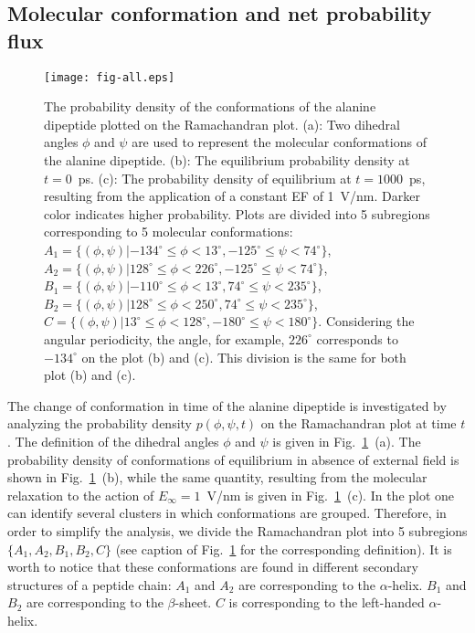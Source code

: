 \documentclass[a4paper,preprint,unsortedaddress,onecolumn]{revtex4-1}
\begin{document}
\subsection{Molecular conformation and net probability flux}

\begin{figure}
  \centering
  \texttt{[image: fig-all.eps]}
  \caption{
    The probability density of the conformations of the alanine dipeptide plotted on the Ramachandran plot.
    (a): Two dihedral angles
    $\phi$ and $\psi$ are used to represent the molecular conformations of the alanine dipeptide.
    (b): The equilibrium probability density 
    at $t=0$~\textsf{ps}. (c): The probability density of equilibrium at $t=1000$~\textsf{ps}, resulting from the application of a constant EF of 1~V/nm. Darker color
    indicates higher probability.
    Plots are divided into 5 subregions corresponding
    to 5 molecular conformations:
    $A_1 = \{(\phi, \psi) | -134^\circ \leq \phi <  13^\circ, -125^\circ \leq \psi < 74^\circ\}$,
    $A_2 = \{(\phi, \psi) |  128^\circ \leq \phi < 226^\circ, -125^\circ \leq \psi < 74^\circ\}$,
    $B_1 = \{(\phi, \psi) | -110^\circ \leq \phi <  13^\circ,   74^\circ \leq \psi < 235^\circ\}$,
    $B_2 = \{(\phi, \psi) |  128^\circ \leq \phi < 250^\circ,   74^\circ \leq \psi < 235^\circ\}$,
    $C   = \{(\phi, \psi) |   13^\circ \leq \phi < 128^\circ, -180^\circ \leq \psi < 180^\circ\}$.
    Considering the angular periodicity, the angle, for example, $226^\circ$ corresponds to $-134^\circ$
    on the plot (b) and (c).
    This division is the same for both plot (b) and (c).
  }
  \label{fig:tmp4}
\end{figure}

The change of conformation in time of the alanine dipeptide is
investigated by analyzing the probability density $p(\phi,\psi,t)$ on
the Ramachandran plot at time $t$. The definition of the dihedral
angles $\phi$ and $\psi$ is given in Fig.~\ref{fig:tmp4}~(a).
The probability density of conformations of equilibrium in absence of external field is shown in Fig.~\ref{fig:tmp4}~(b), while the same quantity, resulting from the molecular relaxation to the action of $E_{\infty} = 1$~V/nm is
given in Fig.~\ref{fig:tmp4}~(c). In the plot one can identify several clusters
in which conformations are grouped.
Therefore, in order to simplify the analysis, we divide the
Ramachandran plot into 5 subregions $\{A_1, A_2, B_1, B_2, C\}$
(see caption of Fig.~\ref{fig:tmp4} for the corresponding definition).
It is worth to notice that these conformations
are found in different secondary structures of a peptide chain:
$A_1$ and $A_2$ are
corresponding to the $\alpha$-helix. $B_1$ and $B_2$ are
corresponding to the $\beta$-sheet. $C$ is corresponding to the
left-handed $\alpha$-helix.
\end{document}

